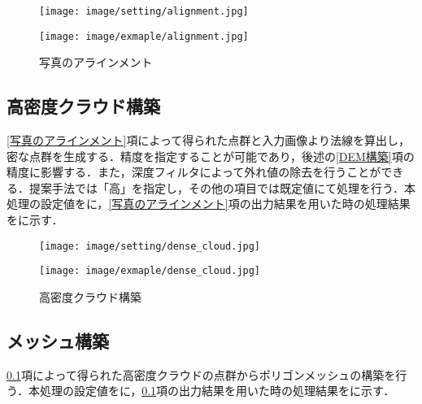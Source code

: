       \begin{figure}[t]
        \begin{minipage}[c]{0.45\hsize}
          \centering
          \texttt{[image: image/setting/alignment.jpg]}
          \label{写真のアラインメント設定値}
        \end{minipage}
        \begin{minipage}[c]{0.45\hsize}
          \centering
          \texttt{[image: image/exmaple/alignment.jpg]}
          \label{写真のアラインメント結果}
        \end{minipage}
        \caption{写真のアラインメント}
      \end{figure}


    \subsection{高密度クラウド構築}
      \label{高密度クラウド構築}
      \ref{写真のアラインメント}項によって得られた点群と入力画像より法線を算出し，密な点群を生成する．精度を指定することが可能であり，後述の\ref{DEM構築}項の精度に影響する．また，深度フィルタによって外れ値の除去を行うことができる．提案手法では「高」を指定し，その他の項目では既定値にて処理を行う．本処理の設定値をに，\ref{写真のアラインメント}項の出力結果を用いた時の処理結果をに示す．

      \begin{figure}[t]
        \begin{minipage}[c]{0.45\hsize}
          \centering
          \texttt{[image: image/setting/dense\_cloud.jpg]}
          \label{高密度クラウド構築設定値}
        \end{minipage}
        \begin{minipage}[c]{0.45\hsize}
          \centering
          \texttt{[image: image/exmaple/dense\_cloud.jpg]}
          \label{高密度クラウド構築結果}
        \end{minipage}
        \caption{高密度クラウド構築}
      \end{figure}


    \subsection{メッシュ構築}
      \label{メッシュ構築}
      \ref{高密度クラウド構築}項によって得られた高密度クラウドの点群からポリゴンメッシュの構築を行う．本処理の設定値をに，\ref{高密度クラウド構築}項の出力結果を用いた時の処理結果をに示す．

